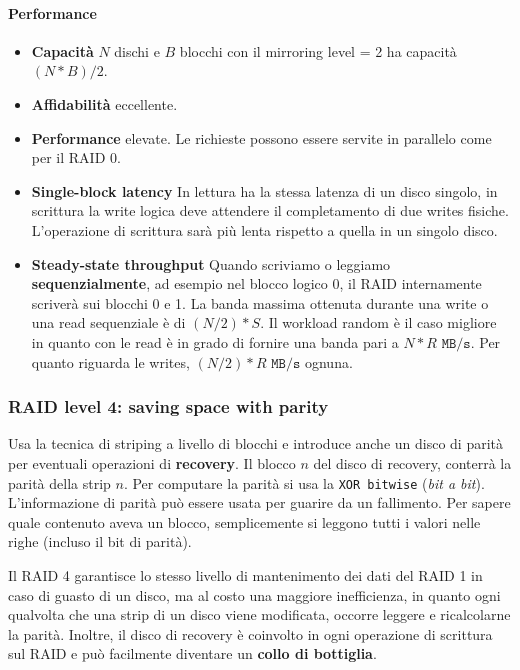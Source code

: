 \documentclass[12pt, twoside, letterpaper]{article}
\begin{document}
				\paragraph{Performance}
					\begin{itemize}
						\item \textbf{Capacità} $N$ dischi e $B$ blocchi con il mirroring level = 2 ha capacità $(N*B)/2$.
						\item \textbf{Affidabilità} eccellente.
						\item \textbf{Performance} elevate. Le richieste possono essere servite in parallelo come per il RAID 0.
						\item \textbf{Single-block latency} In lettura ha la stessa latenza di un disco singolo, in scrittura la write logica deve attendere il completamento di due writes fisiche. L'operazione di scrittura sarà più lenta rispetto a quella in un singolo disco.
						\item \textbf{Steady-state throughput} Quando scriviamo o leggiamo \textbf{sequenzialmente}, ad esempio nel blocco logico 0, il RAID internamente scriverà sui blocchi 0 e 1. La banda massima ottenuta durante una write o una read sequenziale è di $(N/2)*S$.  Il workload random è il caso migliore in quanto con le read è in grado di fornire una banda pari a $N*R \texttt{ MB/s}$. Per quanto riguarda le writes, $(N/2)*R \texttt{ MB/s}$ ognuna.
					\end{itemize}
					
			\subsubsection{RAID level 4: saving space with parity}
				Usa la tecnica di striping a livello di blocchi e introduce anche un disco di parità per eventuali operazioni di \textbf{recovery}. Il blocco $n$ del disco di recovery, conterrà la parità della strip $n$. Per computare la parità si usa la \texttt{XOR bitwise} (\textit{bit a bit}). L'informazione di parità può essere usata per guarire da un fallimento. Per sapere quale contenuto aveva un blocco, semplicemente si leggono tutti i valori nelle righe (incluso il bit di parità).
				
				Il RAID 4 garantisce lo stesso livello di mantenimento dei dati del RAID 1 in caso di guasto di un disco, ma al costo una maggiore inefficienza, in quanto ogni qualvolta che una strip di un disco viene modificata, occorre leggere e ricalcolarne la parità. Inoltre, il disco di recovery è coinvolto in ogni operazione di scrittura sul RAID e può facilmente diventare un \textbf{collo di bottiglia}.
				
\end{document}
